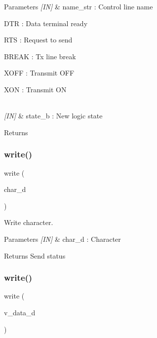 \begin{DoxyParams}{Parameters}
{\em \mbox{[}\+I\+N\mbox{]}} & name\+\_\+str \+: Control line name \begin{DoxyItemize}
\item D\+TR \+: Data terminal ready \item R\+TS \+: Request to send \item B\+R\+E\+AK \+: Tx line break \item X\+O\+FF \+: Transmit O\+FF \item X\+ON \+: Transmit ON \end{DoxyItemize}
\\
\hline
{\em \mbox{[}\+I\+N\mbox{]}} & state\+\_\+b \+: New logic state \\
\hline
\end{DoxyParams}
\begin{DoxyReturn}{Returns}

\end{DoxyReturn}
\mbox{\label{classuart_a6375c10bf3a4f3aa53b2514a43b502cc}} 
\subsubsection{write()\hspace{0.1cm}{\footnotesize\ttfamily [1/4]}}
{\footnotesize\ttfamily write (\begin{DoxyParamCaption}\item[{char\+\_\+d}]{ }\end{DoxyParamCaption})}



Write character. 


\begin{DoxyCode}{0}
\end{DoxyCode}



\begin{DoxyParams}{Parameters}
{\em \mbox{[}\+I\+N\mbox{]}} & char\+\_\+d \+: Character \\
\hline
\end{DoxyParams}
\begin{DoxyReturn}{Returns}
Send status 
\end{DoxyReturn}
\mbox{\label{classuart_a5241e222abf3ac21e20c195de34746df}} 
\subsubsection{write()\hspace{0.1cm}{\footnotesize\ttfamily [2/4]}}
{\footnotesize\ttfamily write (\begin{DoxyParamCaption}\item[{v\+\_\+data\+\_\+d}]{ }\end{DoxyParamCaption})}



